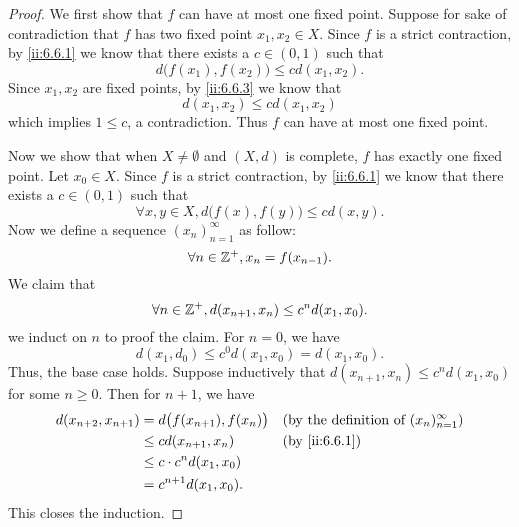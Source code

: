 \begin{proof}
  We first show that \(f\) can have at most one fixed point.
  Suppose for sake of contradiction that \(f\) has two fixed point \(x_1, x_2 \in X\).
  Since \(f\) is a strict contraction, by \cref{ii:6.6.1} we know that there exists a \(c \in (0, 1)\) such that
  \[
    d\big(f(x_1), f(x_2)\big) \leq c d(x_1, x_2).
  \]
  Since \(x_1, x_2\) are fixed points, by \cref{ii:6.6.3} we know that
  \[
    d(x_1, x_2) \leq c d(x_1, x_2)
  \]
  which implies \(1 \leq c\), a contradiction.
  Thus \(f\) can have at most one fixed point.

  Now we show that when \(X \neq \emptyset\) and \((X, d)\) is complete, \(f\) has exactly one fixed point.
  Let \(x_0 \in X\).
  Since \(f\) is a strict contraction, by \cref{ii:6.6.1} we know that there exists a \(c \in (0, 1)\) such that
  \[
    \forall x, y \in X, d\big(f(x), f(y)\big) \leq c d(x, y).
  \]
  Now we define a sequence \((x_n)_{n = 1}^\infty\) as follow:
  \[
    \forall n \in \mathbb{Z}^+, x_n = f(x_{n - 1}).
  \]
  We claim that
  \[
    \forall n \in \mathbb{Z}^+, d(x_{n + 1}, x_n) \leq c^n d(x_1, x_0).
  \]
  we induct on \(n\) to proof the claim.
  For \(n = 0\), we have
  \[
    d(x_1, d_0) \leq c^0 d(x_1, x_0) = d(x_1, x_0).
  \]
  Thus, the base case holds.
  Suppose inductively that \(d(x_{n + 1}, x_n) \leq c^n d(x_1, x_0)\) for some \(n \geq 0\).
  Then for \(n + 1\), we have
  \begin{align*}
    d(x_{n + 2}, x_{n + 1}) & = d\big(f(x_{n + 1}), f(x_n)\big) &  & \text{(by the definition of \((x_n)_{n = 1}^\infty\))} \\
                            & \leq c d(x_{n + 1}, x_n)          &  & \by{ii:6.6.1}                                          \\
                            & \leq c \cdot c^n d(x_1, x_0)                                                                  \\
                            & = c^{n + 1} d(x_1, x_0).
  \end{align*}
  This closes the induction.


\end{proof}

